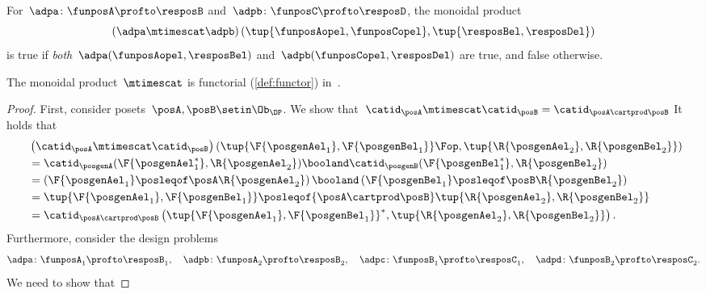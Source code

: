 \begin{remark}
    For~$\adpa \colon \funposA\profto \resposB$ and~$\adpb \colon \funposC \profto \resposD$, the monoidal product
    \begin{equation}
        \left(\adpa \mtimescat \adpb\right)(\tup{\funposAopel, \funposCopel}, \tup{\resposBel,\resposDel})
    \end{equation}
    is true if \emph{both}~$\adpa(\funposAopel,\resposBel)$ and~$\adpb(\funposCopel,\resposDel)$ are true, and false otherwise.
\end{remark}

\begin{lemma}
    \label{lem:monoidal_functorial}
    The monoidal product~$\mtimescat$ is functorial (\cref{def:functor}) in~\DP.
\end{lemma}
\begin{proof}
    First, consider posets~$\posA,\posB\setin \Ob_\DP$.
    We show that~$\catid_\posA\mtimescat \catid_\posB = \catid_{\posA\cartprod \posB}$
    It holds that
    \begin{equation}
        \begin{aligned}
            ~ & \left( \catid_{\posA}\mtimescat \catid_{\posB}\right)
            \left( \tup{\F{\posgenAel_1},\F{\posgenBel_1}}\Fop,\tup{\R{\posgenAel_2},\R{\posgenBel_2}}\right) \\
              & =
            \catid_\posgenA(\F{\posgenAel_1^*},\R{\posgenAel_2})\booland \catid_\posgenB(\F{\posgenBel_1^*},\R{\posgenBel_2}) \\
              & =\left( \F{\posgenAel_1}\posleqof\posA \R{\posgenAel_2}\right)\booland \left( \F{\posgenBel_1}\posleqof\posB \R{\posgenBel_2}\right) \\
              & =\tup{\F{\posgenAel_1},\F{\posgenBel_1}}\posleqof{\posA\cartprod \posB}\tup{\R{\posgenAel_2},\R{\posgenBel_2}} \\
              & =\catid_{\posA\cartprod \posB}\left( \tup{\F{\posgenAel_1},\F{\posgenBel_1}}^*,\tup{\R{\posgenAel_2},\R{\posgenBel_2}}\right).
        \end{aligned}
    \end{equation}
    Furthermore, consider the design problems
    \begin{equation*}
        \adpa\colon \funposA_1 \profto \resposB_1,\quad \adpb\colon \funposA_2\profto \resposB_2, \quad \adpc\colon \funposB_1\profto \resposC_1,\quad \adpd\colon \funposB_2\profto \resposC_2.
    \end{equation*}
    We need to show that

\end{proof}
